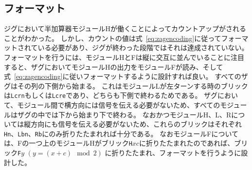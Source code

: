 \documentclass[a4,11pt]{article}
\begin{document}
\subsection{フォーマット}
ジグにおいて半加算器モジュールHが働くことによってカウントアップがされることがわかった。
しかし、カウントの値は式~\eqref{eq:zagencoding}に従ってフォーマットされている必要があり、ジグが終わった段階ではそれは達成されていない。
フォーマットを行うには、モジュールHとFは縦に交互に並んでいることに注目すると、ザグにおいてモジュールHの出力をモジュールFが読み、そして式~\eqref{eq:zagencoding}に従いフォーマットするように設計すれば良い。
すべてのザグはその列の下側から始まる。
これはモジュールLが左ターンする時のブリックは\texttt{Lcrn}もしくは\texttt{Lcre}であり、どちらも下側で終わるためである。
ザグにおいて、モジュール間で横方向には信号を伝える必要がないため、すべてのモジュールはザグの中では下から始まり下で終わる。
なおかつモジュールH、L、Rについては縦方向にも信号を伝える必要がないため、これらのブリックはそれぞれ\texttt{Hn}、\texttt{Lbn}、\texttt{Rb}にのみ折りたたまれれば十分である。
なおモジュールFについては、Fの一つ上のモジュールHがブリック\texttt{H}$xc$に折りたたまれたのであれば、ブリック\texttt{F}$y$ $(y = (x+c) \mod 2)$ に折りたたまれ、フォーマットを行うように設計した。
\end{document}
